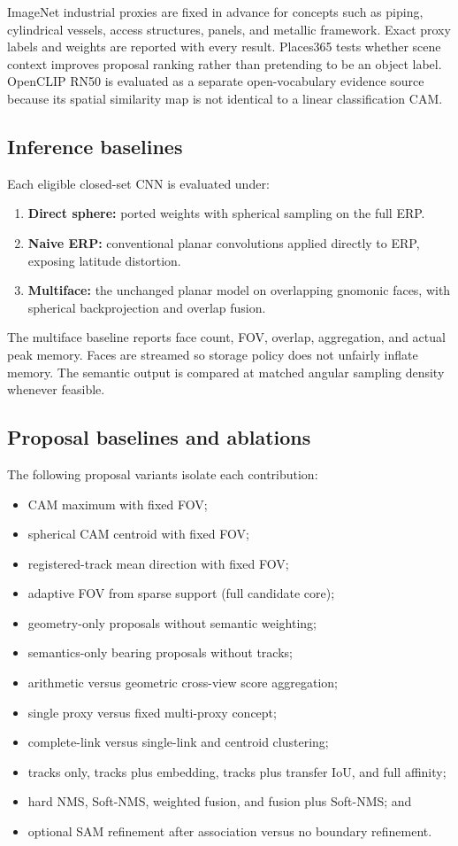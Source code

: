 \documentclass[a4paper,9pt]{extarticle}
\begin{document}
ImageNet industrial proxies are fixed in advance for concepts such as piping, cylindrical vessels, access structures, panels, and metallic framework. Exact proxy labels and weights are reported with every result. Places365 tests whether scene context improves proposal ranking rather than pretending to be an object label. OpenCLIP RN50 is evaluated as a separate open-vocabulary evidence source because its spatial similarity map is not identical to a linear classification CAM.

\subsection{Inference baselines}

Each eligible closed-set CNN is evaluated under:
\begin{enumerate}
 \item \textbf{Direct sphere:} ported weights with spherical sampling on the full ERP.
 \item \textbf{Naive ERP:} conventional planar convolutions applied directly to ERP, exposing latitude distortion.
 \item \textbf{Multiface:} the unchanged planar model on overlapping gnomonic faces, with spherical backprojection and overlap fusion.
\end{enumerate}
The multiface baseline reports face count, FOV, overlap, aggregation, and actual peak memory. Faces are streamed so storage policy does not unfairly inflate memory. The semantic output is compared at matched angular sampling density whenever feasible.

\subsection{Proposal baselines and ablations}

The following proposal variants isolate each contribution:
\begin{itemize}
 \item CAM maximum with fixed FOV;
 \item spherical CAM centroid with fixed FOV;
 \item registered-track mean direction with fixed FOV;
 \item adaptive FOV from sparse support (full candidate core);
 \item geometry-only proposals without semantic weighting;
 \item semantics-only bearing proposals without tracks;
 \item arithmetic versus geometric cross-view score aggregation;
 \item single proxy versus fixed multi-proxy concept;
 \item complete-link versus single-link and centroid clustering;
 \item tracks only, tracks plus embedding, tracks plus transfer IoU, and full affinity;
 \item hard NMS, Soft-NMS, weighted fusion, and fusion plus Soft-NMS; and
 \item optional SAM refinement after association versus no boundary refinement.
\end{itemize}
\end{document}
